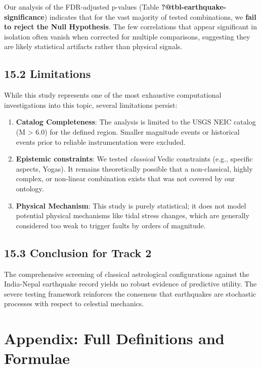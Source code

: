 \documentclass[
  11pt,
  a4paper,
  oneside,
  openany]{report}
\providecommand{\tightlist}{%
  \setlength{\itemsep}{0pt}\setlength{\parskip}{0pt}}\usepackage{longtable,booktabs,array}
\begin{document}
Our analysis of the FDR-adjusted p-values (Table
\textbf{?@tbl-earthquake-significance}) indicates that for the vast
majority of tested combinations, we \textbf{fail to reject the Null
Hypothesis}. The few correlations that appear significant in isolation
often vanish when corrected for multiple comparisons, suggesting they
are likely statistical artifacts rather than physical signals.

\section{15.2 Limitations}\label{limitations-1}

While this study represents one of the most exhaustive computational
investigations into this topic, several limitations persist:

\begin{enumerate}
\def\labelenumi{\arabic{enumi}.}
\tightlist
\item
  \textbf{Catalog Completeness}: The analysis is limited to the USGS
  NEIC catalog (M \textgreater{} 6.0) for the defined region. Smaller
  magnitude events or historical events prior to reliable
  instrumentation were excluded.
\item
  \textbf{Epistemic constraints}: We tested \emph{classical} Vedic
  constraints (e.g., specific aspects, Yogas). It remains theoretically
  possible that a non-classical, highly complex, or non-linear
  combination exists that was not covered by our ontology.
\item
  \textbf{Physical Mechanism}: This study is purely statistical; it does
  not model potential physical mechanisms like tidal stress changes,
  which are generally considered too weak to trigger faults by orders of
  magnitude.
\end{enumerate}

\section{15.3 Conclusion for Track 2}\label{conclusion-for-track-2}

The comprehensive screening of classical astrological configurations
against the India-Nepal earthquake record yields no robust evidence of
predictive utility. The severe testing framework reinforces the
consensus that earthquakes are stochastic processes with respect to
celestial mechanics.

\chapter{Appendix: Full Definitions and
Formulae}\label{appendix-full-definitions-and-formulae}
\end{document}
